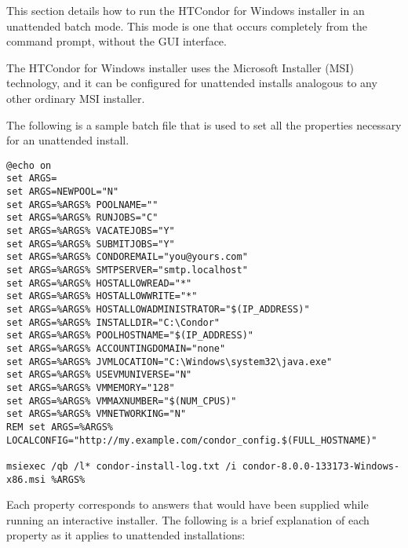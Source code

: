 This section details how to run the HTCondor for Windows installer in an
unattended batch mode.
This mode is one that occurs completely from the command prompt,
without the GUI interface.

The HTCondor for Windows installer uses the Microsoft Installer (MSI)
technology, and it can be configured for unattended installs analogous
to any other ordinary MSI installer.

The following is a sample batch file that is used to set all the
properties necessary for an unattended install.

\begin{verbatim}
@echo on
set ARGS=
set ARGS=NEWPOOL="N"
set ARGS=%ARGS% POOLNAME=""
set ARGS=%ARGS% RUNJOBS="C"
set ARGS=%ARGS% VACATEJOBS="Y"
set ARGS=%ARGS% SUBMITJOBS="Y"
set ARGS=%ARGS% CONDOREMAIL="you@yours.com"
set ARGS=%ARGS% SMTPSERVER="smtp.localhost"
set ARGS=%ARGS% HOSTALLOWREAD="*"
set ARGS=%ARGS% HOSTALLOWWRITE="*"
set ARGS=%ARGS% HOSTALLOWADMINISTRATOR="$(IP_ADDRESS)"
set ARGS=%ARGS% INSTALLDIR="C:\Condor"
set ARGS=%ARGS% POOLHOSTNAME="$(IP_ADDRESS)"
set ARGS=%ARGS% ACCOUNTINGDOMAIN="none"
set ARGS=%ARGS% JVMLOCATION="C:\Windows\system32\java.exe"
set ARGS=%ARGS% USEVMUNIVERSE="N"
set ARGS=%ARGS% VMMEMORY="128"
set ARGS=%ARGS% VMMAXNUMBER="$(NUM_CPUS)"
set ARGS=%ARGS% VMNETWORKING="N"
REM set ARGS=%ARGS% LOCALCONFIG="http://my.example.com/condor_config.$(FULL_HOSTNAME)"
 
msiexec /qb /l* condor-install-log.txt /i condor-8.0.0-133173-Windows-x86.msi %ARGS%
\end{verbatim}

Each property corresponds to answers that would have been
supplied while running an interactive installer.
The following is a brief explanation of each property
as it applies to unattended installations:

